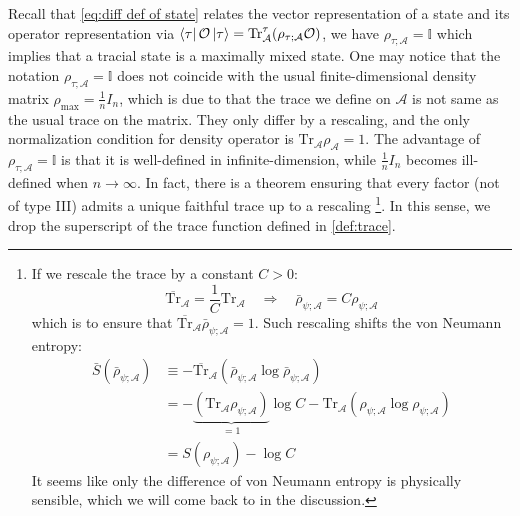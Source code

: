 \documentclass[a4paper,11pt]{article}
\newcommand{\diracprod}[3]{\left\langle  #1 \vphantom{#2#3} \right|#2 \left| #3 \vphantom{#1#2} \right\rangle } %
\renewcommand{\=}[1]{\stackrel{#1}{=}} %
\def\A{\mathcal{A}}
\def\O{\mathcal{O}}
\def\Tr{\text{Tr}}
\begin{document}
Recall that \eqref{eq:diff def of state} relates the vector representation of a state and its operator representation via $\diracprod{\tau}{\O}{\tau}=\Tr_{\A}^\tau(\rho_{\tau;\A}\O)$, we have $\rho_{\tau;\A}=\mathbb{I}$ which implies that a tracial state is a maximally mixed state. One may notice that the notation $\rho_{\tau;\A}=\mathbb{I}$ does not coincide with the usual finite-dimensional density matrix $\rho_{\text{max}}=\frac{1}{n}I_n$, which is due to that the trace we define on $\A$ is not same as the usual trace on the matrix. They only differ by a rescaling, and the only normalization condition for density operator is $\Tr_{\A}\rho_{\A}=1$. The advantage of $\rho_{\tau;\A}=\mathbb{I}$ is that it is well-defined in infinite-dimension, while $\frac{1}{n}I_n$ becomes ill-defined when $n\rightarrow\infty$. In fact, there is a theorem ensuring that every factor (not of type III) admits a unique faithful trace up to a rescaling \cite{Sorce:2023fdx,Longo:2022lod}\footnote{\label{fn:rescale}If we rescale the trace by a constant $C>0$: 
	\begin{equation}
		\overline{\Tr}_{\A}=\frac{1}{C}\Tr_{\A}\quad \Rightarrow\quad \bar{\rho}_{\psi;\A}=C \rho_{\psi;\A}
	\end{equation}
	which is to ensure that $\overline{\Tr}_{\A}\bar{\rho}_{\psi;\A}=1$. 	Such rescaling shifts the von Neumann entropy:
	\begin{equation}
		\begin{aligned}
			\bar{S}(\bar{\rho}_{\psi;\A})&\equiv -\overline{\Tr}_{\A}\left(\bar{\rho}_{\psi;\A}\log\bar{\rho}_{\psi;\A}\right)\\
			&=-\underbrace{\left(\Tr_{\A}\rho_{\psi;\A}\right)}_{=1}\log C -\Tr_{\A}\left(\rho_{\psi;\A}\log \rho_{\psi;\A}\right)\\
			&=S(\rho_{\psi;\A})-\log C
		\end{aligned}
	\end{equation}
	It seems like only the difference of von Neumann entropy is physically sensible, which we will come back to in the discussion.}. In this sense, we drop the superscript of the trace function defined in \eqref{def:trace}.
\end{document}
